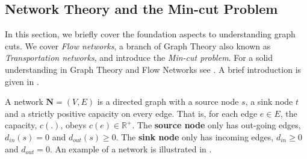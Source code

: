 
\subsection{Network Theory and the Min-cut Problem}
\label{sec:NetworkTheory}

In this section, we briefly cover the foundation aspects to understanding graph cuts. We cover \textit{Flow networks}, a branch of Graph Theory also known as \textit{Transportation networks}, and introduce the \textit{Min-cut problem}. For a solid understanding in Graph Theory and Flow Networks see \citep{Deo1974,Bondy1976,Steen2010,Newman2010}. A brief introduction is given in .

\begin{definition}[Network]
	A network $\textbf{N} = (V,E)$ is a directed graph with a source node $s$, a sink node $t$ and a strictly positive capacity on every edge. That is, for each edge $e \in E$, the capacity, $c(.)$, obeys $c(e) \in \mathbb{R}^{+}$.
	The \textbf{source node} only has out-going edges, $d_{in}(s) = 0$ and $d_{out}(s) \geq 0$. The \textbf{sink node} only has incoming edges, $d_{in} \geq 0$ and $d_{out} = 0$. An example of a network is illustrated in .
\end{definition}

